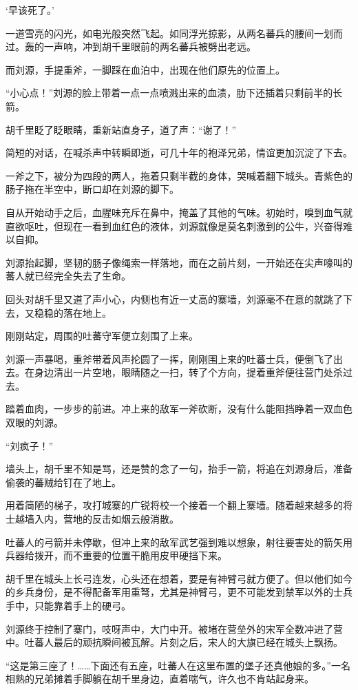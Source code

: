 ‘早该死了。’

一道雪亮的闪光，如电光般突然飞起。如同浮光掠影，从两名蕃兵的腰间一划而过。轰的一声响，冲到胡千里眼前的两名蕃兵被劈出老远。

而刘源，手提重斧，一脚踩在血泊中，出现在他们原先的位置上。

“小心点！”刘源的脸上带着一点一点喷溅出来的血渍，肋下还插着只剩前半的长箭。

胡千里眨了眨眼睛，重新站直身子，道了声：“谢了！”

简短的对话，在喊杀声中转瞬即逝，可几十年的袍泽兄弟，情谊更加沉淀了下去。

一斧之下，被分为四段的两人，拖着只剩半截的身体，哭喊着翻下城头。青紫色的肠子拖在半空中，断口却在刘源的脚下。

自从开始动手之后，血腥味充斥在鼻中，掩盖了其他的气味。初始时，嗅到血气就直欲呕吐，但现在一看到血红色的液体，刘源就像是莫名刺激到的公牛，兴奋得难以自抑。

刘源抬起脚，坚韧的肠子像绳索一样落地，而在之前片刻，一开始还在尖声嚎叫的蕃人就已经完全失去了生命。

回头对胡千里又道了声小心，内侧也有近一丈高的寨墙，刘源毫不在意的就跳了下去，又稳稳的落在地上。

刚刚站定，周围的吐蕃守军便立刻围了上来。

刘源一声暴喝，重斧带着风声抡圆了一挥，刚刚围上来的吐蕃士兵，便倒飞了出去。在身边清出一片空地，眼睛随之一扫，转了个方向，提着重斧便往营门处杀过去。

踏着血肉，一步步的前进。冲上来的敌军一斧砍断，没有什么能阻挡睁着一双血色双眼的刘源。

“刘疯子！”

墙头上，胡千里不知是骂，还是赞的念了一句，抬手一箭，将追在刘源身后，准备偷袭的蕃贼给钉在了地上。

用着简陋的梯子，攻打城寨的广锐将校一个接着一个翻上寨墙。随着越来越多的将士越墙入内，营地的反击如烟云般消散。

吐蕃人的弓箭并未停歇，但冲上来的敌军武艺强到难以想象，射往要害处的箭矢用兵器给拨开，而不重要的位置干脆用皮甲硬挡下来。

胡千里在城头上长弓连发，心头还在想着，要是有神臂弓就方便了。但以他们如今的乡兵身份，是不得配备军用重弩，尤其是神臂弓，更不可能发到禁军以外的士兵手中，只能靠着手上的硬弓。

刘源终于控制了寨门，吱呀声中，大门中开。被堵在营垒外的宋军全数冲进了营中。吐蕃人最后的顽抗瞬间被瓦解。片刻之后，宋人的大旗已经在城头上飘扬。

“这是第三座了！……下面还有五座，吐蕃人在这里布置的堡子还真他娘的多。”一名相熟的兄弟摊着手脚躺在胡千里身边，直着喘气，许久也不肯站起身来。

